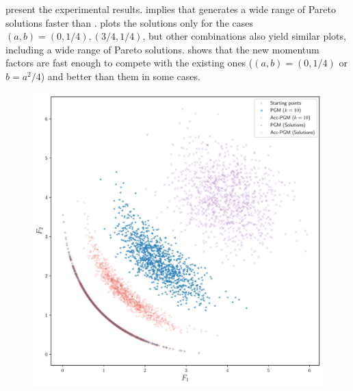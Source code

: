 \documentclass[../main]{subfiles}
\begin{document}
 present the experimental results.
 implies that  generates a wide range of Pareto solutions faster than .
 plots the solutions only for the cases~$(a, b) = (0, 1 / 4), (3 / 4, 1 / 4)$, but other combinations also yield similar plots, including a wide range of Pareto solutions.
 shows that the new momentum factors are fast enough to compete with the existing ones ($(a, b) = (0, 1/4)$ or $b = a^2/4$) and better than them in some cases.

\begin{figure}[htbp]
    \centering
    \begin{minipage}[b]{.49\hsize}
        \centering
        \includegraphics[width=\textwidth]{figs/JOS1.pdf}
    \end{minipage}
    \begin{minipage}[b]{.49\hsize}
        \centering

\end{minipage}
\end{figure}
\end{document}
